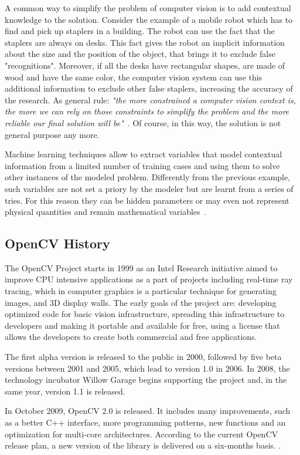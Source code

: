 	A common way to simplify the problem of computer vision is to add contextual knowledge to the solution. 
	Consider the example of a mobile robot which has to find and pick up staplers in a building. The robot can use the fact that the staplers are always on desks. This fact gives the robot an implicit information about the size and the position of the object, that brings it to exclude false "recognitions". Moreover, if all the desks have rectangular shapes, are made of wood and have the same color, the computer vision system can use this additional information to exclude other false staplers, increasing the accuracy of the research. As general rule: \emph{"the more constrained a computer vision context is, the more we can rely on those constraints to simplify the problem and the more reliable our final solution will be"}~\cite[5]{bradski2008learning}. Of course, in this way, the solution is not general purpose any more.
	
	Machine learning techniques allow to extract variables that model contextual information from a limited number of training cases and using them to solve other instances of the modeled problem. 
	Differently from the previous example, such variables are not set a priory by the modeler but are learnt from a series of tries. For this reason they can be hidden parameters or may even not represent physical quantities and remain mathematical variables~\cite{bradski2008learning}.

	\subsection{OpenCV History}
	The \mbox{OpenCV} Project starts in 1999 as an Intel Research initiative aimed to improve CPU intensive applications as a part of projects including real-time ray tracing, which in computer graphics is a particular technique for generating images, and 3D display walls. The early goals of the project are: developing optimized code for basic vision infrastructure, spreading this infrastructure to developers and making it portable and available for free, using a license that allows the developers to create both commercial and free applications.

	The first alpha version is released to the public in 2000, followed by five beta versions between 2001 and 2005, which lead to version 1.0 in 2006. In 2008, the technology incubator Willow Garage begins supporting the project and, in the same year, version 1.1  is released.

	In October 2009, \mbox{OpenCV} 2.0 is released. It includes many improvements, such as a better C++ interface, more programming patterns, new functions and an optimization for multi-core architectures. According to the current \mbox{OpenCV} release plan, a new version of the library is delivered on a six-months basis. \cite{OpenCV:ChangeLogs}.



